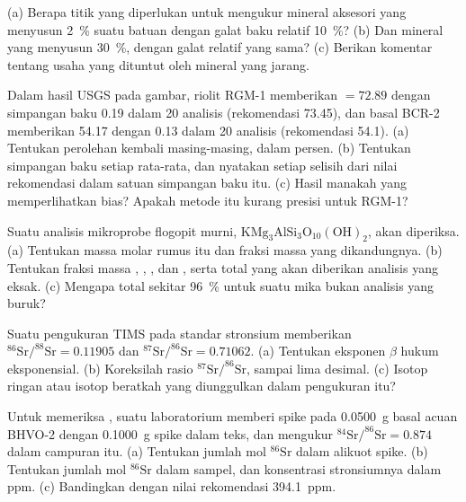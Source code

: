 \begin{exercise}[$\star\star$]\label{exo:b2:field-lab-methods-2:5}
(a) Berapa titik yang diperlukan untuk mengukur mineral aksesori yang menyusun \qty{2}{\percent} suatu batuan
dengan galat baku relatif \qty{10}{\percent}? (b) Dan mineral yang menyusun \qty{30}{\percent},
dengan galat relatif yang sama? (c) Berikan komentar tentang usaha yang dituntut oleh mineral yang jarang.
\end{exercise}

\begin{exercise}[$\star\star$]\label{exo:b2:field-lab-methods-2:6}
Dalam hasil USGS pada gambar, riolit RGM-1 memberikan  $= 72.89$ dengan simpangan
baku 0.19 dalam 20 analisis (rekomendasi 73.45), dan basal BCR-2 memberikan 54.17 dengan 0.13 dalam
20 analisis (rekomendasi 54.1). (a) Tentukan perolehan kembali masing-masing, dalam persen. (b) Tentukan simpangan
baku setiap rata-rata, dan nyatakan setiap selisih dari nilai rekomendasi dalam satuan simpangan baku itu.
(c) Hasil manakah yang memperlihatkan bias? Apakah metode itu kurang presisi untuk RGM-1?
\end{exercise}

\begin{exercise}[$\star\star$]\label{exo:b2:field-lab-methods-2:7}
Suatu analisis mikroprobe flogopit murni, $\mathrm{KMg_3AlSi_3O_{10}(OH)_2}$, akan diperiksa.
(a) Tentukan massa molar rumus itu dan fraksi massa  yang dikandungnya. (b) Tentukan
fraksi massa , , , dan , serta total yang akan diberikan analisis
yang eksak. (c) Mengapa total sekitar \qty{96}{\percent} untuk suatu mika bukan analisis yang buruk?
\end{exercise}

\begin{exercise}[$\star\star$]\label{exo:b2:field-lab-methods-2:8}
Suatu pengukuran TIMS pada standar stronsium memberikan $^{86}\mathrm{Sr}/^{88}\mathrm{Sr} = 0.11905$ dan
$^{87}\mathrm{Sr}/^{86}\mathrm{Sr} = 0.71062$. (a) Tentukan eksponen $\beta$ hukum eksponensial.
(b) Koreksilah rasio $^{87}\mathrm{Sr}/^{86}\mathrm{Sr}$, sampai lima desimal. (c) Isotop ringan atau
isotop beratkah yang diunggulkan dalam pengukuran itu?
\end{exercise}

\begin{exercise}[$\star\star$]\label{exo:b2:field-lab-methods-2:9}
Untuk memeriksa , suatu laboratorium memberi spike pada \qty{0.0500}{g} basal acuan BHVO-2
dengan \qty{0.1000}{g} spike dalam teks, dan mengukur $^{84}\mathrm{Sr}/^{86}\mathrm{Sr} =
0.874$ dalam campuran itu. (a) Tentukan jumlah mol $^{86}\mathrm{Sr}$ dalam alikuot spike. (b) Tentukan
jumlah mol $^{86}\mathrm{Sr}$ dalam sampel, dan konsentrasi stronsiumnya dalam ppm. (c) Bandingkan dengan
nilai rekomendasi \qty{394.1}{ppm}.
\end{exercise}

